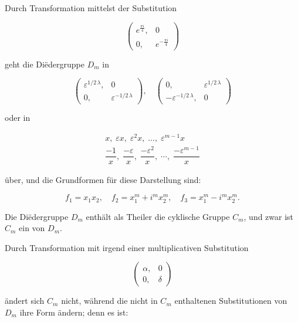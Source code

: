 Durch Transformation mittelst der Substitution

\[
\begin{pmatrix} e^{\frac{\pi i}{4}}, & 0 \\ 0, & e^{-\frac{\pi i}{4}} \end{pmatrix}
\]

geht die Di\"edergruppe $D_m$ in

\[
\begin{pmatrix} \varepsilon^{1/2\,\lambda}, & 0 \\ 0, & \varepsilon^{-1/2\,\lambda} \end{pmatrix}, \quad
\begin{pmatrix} 0, & \varepsilon^{1/2\,\lambda} \\ -\varepsilon^{-1/2\,\lambda}, & 0 \end{pmatrix}
\]

oder in

\[
\begin{gathered}
x, \; \varepsilon x, \; \varepsilon^2 x, \; \ldots, \; \varepsilon^{m-1} x\\[4pt]
\dfrac{-1}{x}, \; \dfrac{-\varepsilon}{x}, \; \dfrac{-\varepsilon^2}{x}, \; \cdots, \; \dfrac{-\varepsilon^{m-1}}{x}
\end{gathered}
\]

\"uber, und die Grundformen f\"ur diese Darstellung sind:

\[
f_1 = x_1 x_2, \quad f_2 = x_1^m + i^m x_2^m, \quad f_3 = x_1^m - i^m x_2^m.
\]

Die Di\"edergruppe $D_m$ enth\"alt als Theiler die cyklische
Gruppe $C_m$, und zwar ist $C_m$ ein  von $D_m$.

Durch Transformation mit irgend einer multiplicativen
Substitution

\[
\begin{pmatrix} \alpha, & 0 \\ 0, & \delta \end{pmatrix}
\]

\"andert sich $C_m$ nicht, w\"ahrend die nicht in $C_m$ enthaltenen Substitutionen
 von $D_m$ ihre Form \"andern; denn es ist:

